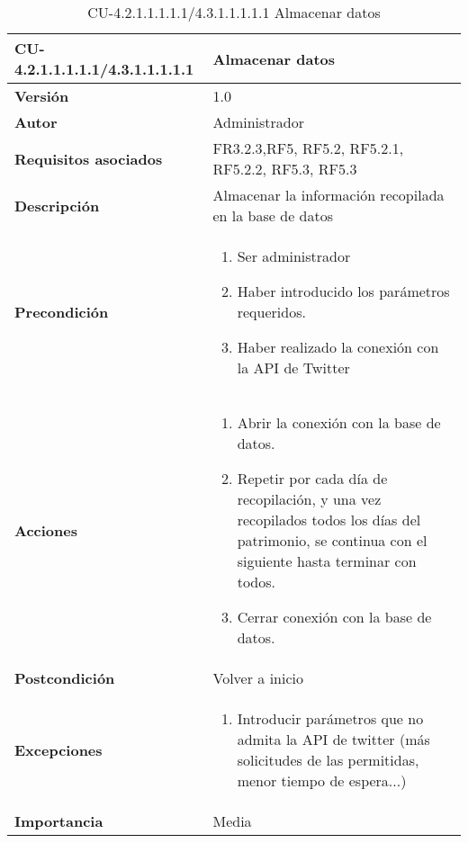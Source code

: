 \begin{table}[h!]
	\centering
	\begin{tabularx}{\linewidth}{ p{} p{} }
		\toprule
		\textbf{CU-4.2.1.1.1.1.1/4.3.1.1.1.1.1}    & \textbf{Almacenar datos}\\
		\toprule
		\textbf{Versión}              & 1.0    \\
		\textbf{Autor}                & Administrador \\
		\textbf{Requisitos asociados} & FR3.2.3,RF5, RF5.2, RF5.2.1, RF5.2.2, RF5.3, RF5.3\\
		\textbf{Descripción}          & Almacenar la información recopilada en la base de datos\\
        \textbf{Precondición}         &  
  	\begin{enumerate}
			\def\labelenumi{\arabic{enumi}.}
			\tightlist
			\item Ser administrador
                \item Haber introducido los parámetros requeridos.
                \item Haber realizado la conexión con la API de Twitter
		\end{enumerate}\\
		\textbf{Acciones}             &
		\begin{enumerate}
			\def\labelenumi{\arabic{enumi}.}
			\tightlist
            \item Abrir la conexión con la base de datos.
            \item Repetir por cada día de recopilación, y una vez recopilados todos los días del patrimonio, se continua con el siguiente hasta terminar con todos.
            \item Cerrar conexión con la base de datos.
            \end{enumerate}\\
            
		\textbf{Postcondición}     &   Volver a inicio \\
		\textbf{Excepciones}          & 
        \begin{enumerate}
            \def\labelenumi{\arabic{enumi}.}
            \tightlist
            \item Introducir parámetros que no admita la API de twitter (más solicitudes de las permitidas, menor tiempo de espera...)
		\end{enumerate}\\
		\textbf{Importancia}          & Media\\
		\bottomrule
	\end{tabularx}
	\caption{CU-4.2.1.1.1.1.1/4.3.1.1.1.1.1 Almacenar datos}
\end{table}

